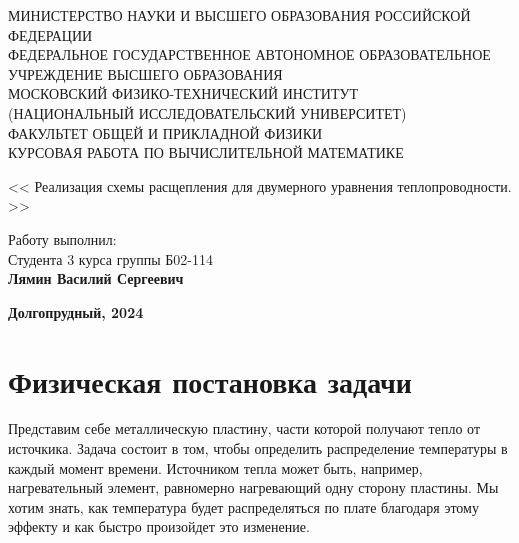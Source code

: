 \documentclass[a4paper]{article}
\begin{document}
\begin{center}
	\hfill \break
	{\small МИНИСТЕРСТВО НАУКИ И ВЫСШЕГО ОБРАЗОВАНИЯ РОССИЙСКОЙ ФЕДЕРАЦИИ}\\
	\hfill \break
	{\small ФЕДЕРАЛЬНОЕ ГОСУДАРСТВЕННОЕ АВТОНОМНОЕ ОБРАЗОВАТЕЛЬНОЕ\\ УЧРЕЖДЕНИЕ ВЫСШЕГО ОБРАЗОВАНИЯ\\ МОСКОВСКИЙ ФИЗИКО-ТЕХНИЧЕСКИЙ ИНСТИТУТ\\ (НАЦИОНАЛЬНЫЙ ИССЛЕДОВАТЕЛЬСКИЙ УНИВЕРСИТЕТ)\\ ФАКУЛЬТЕТ ОБЩЕЙ И ПРИКЛАДНОЙ ФИЗИКИ}\\
	\hfill \break
	\hfill \break
	\hfill \break
	\hfill \break
	\hfill \break
	\normalsize{КУРСОВАЯ РАБОТА ПО ВЫЧИСЛИТЕЛЬНОЙ МАТЕМАТИКЕ}\\
	\hfill \break
	\hfill \break
	\hfill \break
	\hfill \break
	\hfill \break
	\hfill \break
	\hfill \break

	\large{<< Реализация схемы расщепления для двумерного уравнения теплопроводности. >>}\\
\end{center}
\hfill \break
\hfill \break
\hfill \break
\hfill \break
\hfill \break





\begin{flushright}
	\normalsize{Работу выполнил:}\\
	\normalsize{Студента 3 курса группы Б02-114}\\
	\normalsize{\textbf{Лямин Василий Сергеевич}}\\
\end{flushright}



\hfill \break
\hfill \break

\begin{center}
	\normalsize{\textbf{Долгопрудный, 2024}}
\end{center}


\thispagestyle{empty} %

\newpage
\tableofcontents

\newpage

\section{Физическая постановка задачи}
Представим себе металлическую пластину, части которой получают тепло от источкика. Задача состоит в том, чтобы определить распределение температуры в каждый момент времени. Источником тепла может быть, например, нагревательный элемент, равномерно нагревающий одну сторону пластины. Мы хотим знать, как температура будет распределяться по плате благодаря этому эффекту и как быстро произойдет это изменение.
\end{document}
